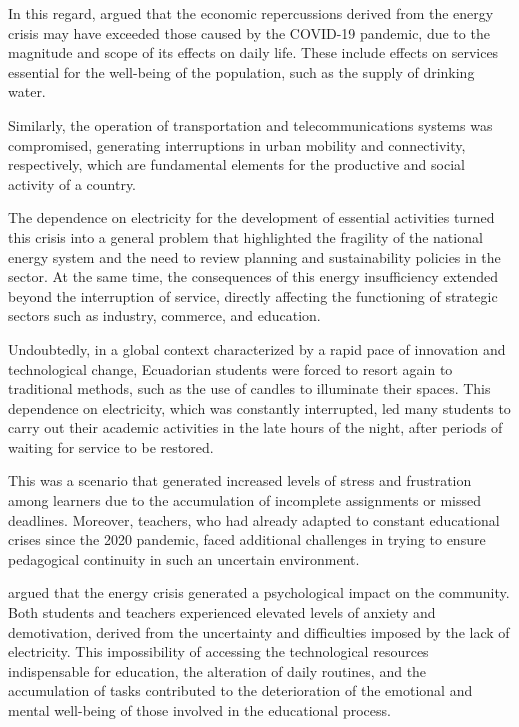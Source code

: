 \documentclass[english]{textolivre}
\begin{document}
In this regard, \textcite{orellana2024educacion} argued that the economic repercussions derived from the energy crisis may have exceeded those caused by the COVID-19 pandemic, due to the magnitude and scope of its effects on daily life. These include effects on services essential for the well-being of the population, such as the supply of drinking water.

Similarly, the operation of transportation and telecommunications systems was compromised, generating interruptions in urban mobility and connectivity, respectively, which are fundamental elements for the productive and social activity of a country.

The dependence on electricity for the development of essential activities turned this crisis into a general problem that highlighted the fragility of the national energy system and the need to review planning and sustainability policies in the sector. At the same time, the consequences of this energy insufficiency extended beyond the interruption of service, directly affecting the functioning of strategic sectors such as industry, commerce, and education.

Undoubtedly, in a global context characterized by a rapid pace of innovation and technological change, Ecuadorian students were forced to resort again to traditional methods, such as the use of candles to illuminate their spaces. This dependence on electricity, which was constantly interrupted, led many students to carry out their academic activities in the late hours of the night, after periods of waiting for service to be restored.

This was a scenario that generated increased levels of stress and frustration among learners due to the accumulation of incomplete assignments or missed deadlines. Moreover, teachers, who had already adapted to constant educational crises since the 2020 pandemic, faced additional challenges in trying to ensure pedagogical continuity in such an uncertain environment.

\textcite{guerrero2024planemergencias} argued that the energy crisis generated a psychological impact on the community. Both students and teachers experienced elevated levels of anxiety and demotivation, derived from the uncertainty and difficulties imposed by the lack of electricity. This impossibility of accessing the technological resources indispensable for education, the alteration of daily routines, and the accumulation of tasks contributed to the deterioration of the emotional and mental well-being of those involved in the educational process.
\end{document}
